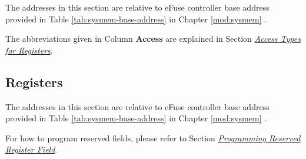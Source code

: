 \documentclass[main\_\_EN.tex]{subfiles}
\begin{document}
The addresses in this section are relative to eFuse controller base address provided in Table \ref{tab:sysmem-base-address} in Chapter \ref{mod:sysmem} \textit{}.

The abbreviations given in Column \textbf{Access} are explained in Section \hyperref[glossary-access-types]{\textit{Access Types for Registers}}.







\newpage
\subsection{Registers}

The addresses in this section are relative to eFuse controller base address provided in Table \ref{tab:sysmem-base-address} in Chapter \ref{mod:sysmem} \textit{}.

For how to program reserved fields, please refer to Section \hyperref[programming-reserved-field]{\textit{Programming Reserved Register Field}}.

\end{document}
